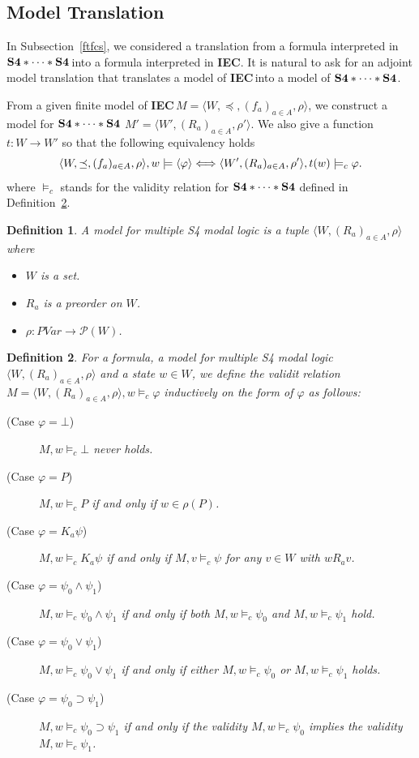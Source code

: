 \documentclass[doctor]{iscs-thesis}
\newcommand{\powerset}[1]{{\mathcal P({#1})}}
\newcommand{\iec}{{\rm {\textbf{IEC}}}}
\newcommand{\ckv}{{\rm {\textbf{S4}\ast\cdots\ast\textbf{S4}}}}
\newcommand{\tuple}[1]{\langle{#1}\rangle}
\newtheorem{definition}{Definition}
\begin{document}
\subsection{Model Translation}

In Subsection~\ref{ftfcs},
 we considered a translation from a formula interpreted
in $\ckv$\,into a formula interpreted in \iec.
It is natural to ask for an adjoint model translation that translates a model of
 \iec\,into a model of $\ckv$.

From a given finite model
 of \iec\,$M = \tuple{W,\preceq, (f_a)_{a\in A}, \rho}$,
we construct a model for $\ckv$
$M' = \tuple{W', (R_a)_{a\in A}, \rho'}$.
We also give a function $t \colon W\rightarrow W'$ so that the following equivalency holds
\[
 \tuple{W,\preceq, (f_a)_{a\in A},\rho}, w\models \go\varphi
 \Longleftrightarrow
 \tuple{W', (R_a)_{a\in A}, \rho'}, t(w)\models_c \varphi.
\]
where $\models_c$ stands for the validity relation for
$\ckv$ defined in Definition~\ref{s4val}.

\begin{definition}
 A model for multiple S4 modal logic is a tuple
 $\tuple{W, (R_a)_{a\in A}, \rho}$ where
 \begin{itemize}
  \item $W$ is a set.
  \item $R_a$ is a preorder on $W$.
  \item $\rho\colon PVar \rightarrow \powerset W$.
 \end{itemize}
\end{definition}

\begin{definition}
 \label{s4val}
 For a formula, a model for multiple S4 modal logic $\tuple{W, (R_a)_{a\in A}, \rho}$
 and a state $w\in W$,
 we define the validit relation $M =\tuple{W, (R_a)_{a\in A}, \rho}, w\models_c\varphi$
 inductively on the form of $\varphi$ as follows:
 \newcommand{\m}{M}
 \begin{description}
 \item[(Case $\varphi=\bot$)] $\m, w\models_c \bot$ never holds.
\item[(Case $\varphi= P$)] $\m, w\models_c P$ if and only if 
$w \in
 \rho(P)$.
 \item[(Case $\varphi = K_a \psi$)] 
	    $\m, w\models_c K_a \psi$ if and only if
	    $\m, v\models_c \psi$ for any $v\in W$ with $w R_a v$.
\item[(Case $\varphi = \psi_0\wedge\psi_1$)]
 $\m, w\models_c \psi_0\wedge\psi_1$ if and only if both
 $\m, w\models_c \psi_0$ and $\m,w\models_c \psi_1$ hold.
\item[(Case $\varphi = \psi_0\vee\psi_1$)]
 $\m, w\models_c \psi_0\vee\psi_1$ if and only if either
 $\m, w\models_c \psi_0$ or $\m,w\models_c \psi_1$ holds.
\item[(Case $\varphi = \psi_0\supset \psi_1$)]
	   $\m, w\models_c \psi_0\supset\psi_1$ if and only if 
	   the validity $M,w\models_c \psi_0$ implies
	   the validity $M, w\models_c
	   \psi_1$.
\end{description}
\end{definition}
\end{document}
